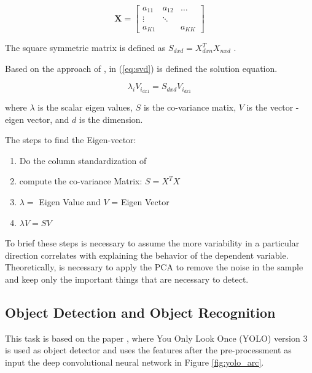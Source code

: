 \begin{equation}\label{eq:matrix}
    \mathbf{X} = \begin{bmatrix} 
    a_{11} & a_{12} & \dots \\
    \vdots & \ddots & \\
    a_{K1} &        & a_{KK} 
    \end{bmatrix}
\end{equation}

The square symmetric matrix is defined as $S_{dxd} = X^T_{dxn}X_{nxd}$ \cite{Halko_2011}. 

Based on the approach of \cite{cambridge2009introduction}, in (\ref{eq:svd}) is defined the solution equation.

\begin{equation}
    \label{eq:svd}
    \lambda_iV_i_{dx1} = S_{dxd}V_i_{dx1}
\end{equation}

where $\lambda$ is the scalar eigen values, $S$ is the co-variance matix, $V$ is the vector - eigen vector, and $d$ is the dimension.

The steps to find the Eigen-vector: 

\begin{enumerate}
    \item Do the column standardization of 
    \item compute the co-variance Matrix: $S = X^TX$
    \item $\lambda = $ Eigen Value and $V$ = Eigen Vector
    \item $\lambda V = SV$
\end{enumerate}

To brief these steps is necessary to assume the more variability in a particular direction correlates with explaining the behavior of the dependent variable. Theoretically, is necessary to apply the PCA to remove the noise in the sample and keep only the important things that are necessary to detect.


\subsection{Object Detection and Object Recognition} 

This task is based on the paper \cite{redmon2016you}, where You Only Look Once (YOLO) version 3 is used as object detector and uses the features after the pre-processment as input the deep convolutional neural network in Figure \ref{fig:yolo_arc}.  

